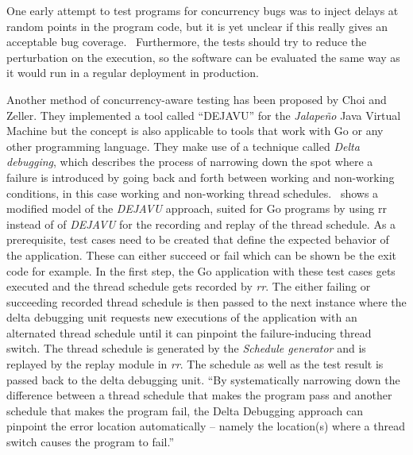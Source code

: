 \documentclass[conference]{IEEEtran}
\begin{document}
One early attempt to test programs for concurrency bugs was to inject delays at random points in the program code, but it is yet unclear if this really gives an acceptable bug coverage.~\cite{lu2008mistakes}
Furthermore, the tests should try to reduce the perturbation on the execution, so the software can be evaluated the same way as it would run in a regular deployment in production.

Another method of concurrency-aware testing has been proposed by Choi and Zeller.\cite{acm2002}
They implemented a tool called ``DEJAVU'' for the \emph{Jalapeño} Java Virtual Machine but the concept is also applicable to tools that work with Go or any other programming language.
They make use of a technique called \emph{Delta debugging}, which describes the process of narrowing down the spot where a failure is introduced by going back and forth between working and non-working conditions, in this case working and non-working thread schedules.~\cite{zeller2002delta}
 shows a modified model of the \emph{DEJAVU} approach, suited for Go programs by using rr instead of of \emph{DEJAVU} for the recording and replay of the thread schedule.
As a prerequisite, test cases need to be created that define the expected behavior of the application.
These can either succeed or fail which can be shown be the exit code for example.
In the first step, the Go application with these test cases gets executed and the thread schedule gets recorded by \emph{rr}.
The either failing or succeeding recorded thread schedule is then passed to the next instance where the delta debugging unit requests new executions of the application with an alternated thread schedule until it can pinpoint the failure-inducing thread switch.
The thread schedule is generated by the \emph{Schedule generator} and is replayed by the replay module in \emph{rr}.
The schedule as well as the test result is passed back to the delta debugging unit.
``By systematically narrowing down the difference between a thread schedule that makes the program pass and another schedule that makes the program fail, the Delta Debugging approach can pinpoint the error location automatically -- namely the location(s) where a thread switch causes the program to fail.''~\cite{acm2002}
\end{document}

